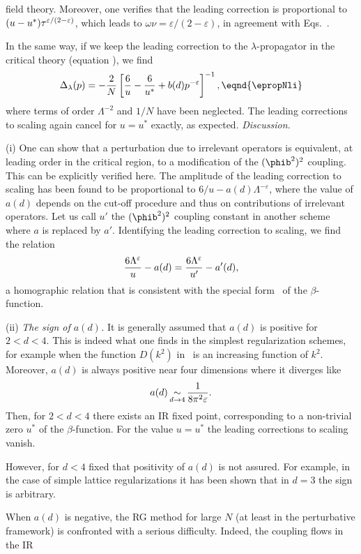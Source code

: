 field theory. Moreover, one verifies that the leading correction is
proportional to $(u-u^*)\tau^{\varepsilon/(2-\varepsilon)}$, which
leads to $\omega\nu=\varepsilon/(2-\varepsilon)$, in agreement with
Eqs.~\eqns{\eNomega,\enuNlim}.
\par
In the same way, if we keep the leading correction to the
$\lambda$-propagator in the critical theory (equation
\ebullecrit), we find
$$ \Delta_{\lambda} (p )=-{2 \over N} \left[{6\over u}-
{6\over u^*}+ b(d)p^{-\varepsilon}
\right]^{-1}, \eqnd{\epropNli}  $$
where terms of order $ \Lambda^{-2} $ and $1/N$ have been neglected.
The leading corrections to scaling again  cancel for $
u=u^{\ast} $ exactly, as expected.
\smallskip
{\it Discussion.} \par
 (i) One can show that a perturbation due to
irrelevant operators is equivalent, at leading order in the critical
region, to a modification of the $(\phib^2)^2$ coupling.  This can
be explicitly  verified here. The amplitude of the leading
correction to scaling has been found to be proportional to
$6/u-a(d)\Lambda^{-\varepsilon}$, where the value of $a(d)$ depends
on the cut-off procedure and thus on contributions of irrelevant
operators. Let us call $u'$ the $(\phib^2)^2$ coupling constant in
another scheme where $a$ is replaced by $a'$. Identifying the
leading correction to scaling, we find the  relation
$${6\Lambda^{\varepsilon} \over u}-a(d)={6\Lambda^{\varepsilon}
\over u'}-a'(d),$$
a homographic relation that is consistent with the special form
\ebetaN\ of the $\beta$-function.\par
 (ii) {\it The sign of
$a(d)$.} It is generally assumed that $a(d )$ is positive for $2<d<4$.  This is indeed what one finds in the simplest regularization schemes, for example
when the function $D(k^2)$ in \epropreg\ is an increasing function of $k^2$.
Moreover, $a(d)$ is always positive near four
dimensions where it diverges like
$$a(d)\mathop{\sim}_{d\to 4} {1\over 8\pi^2\varepsilon}.$$
Then, for $2<d<4$ there exists an IR fixed point, corresponding to a non-trivial zero $u^*$ of the
$\beta$-function. For the value $u=u^*$ the leading corrections to
scaling vanish.\par
However, for $d<4$ fixed  that positivity of $a(d)$ is not assured. For example, in the case of simple lattice
regularizations it has been shown that in $d=3$ the sign is
arbitrary. \par
When $a(d)$ is negative, the RG method for
large $N$ (at least in the perturbative framework) is confronted
with a serious difficulty.  Indeed, the coupling flows in the IR
